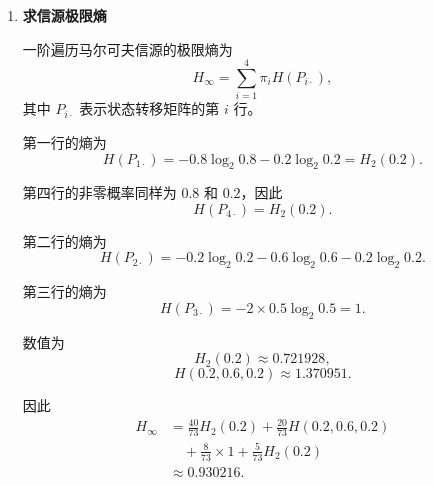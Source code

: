 \documentclass[UTF8,a4paper,12pt]{ctexart}
\begin{document}
\begin{enumerate}[label=\arabic*., leftmargin=2.2em]
稳态分布满足
\[
\boldsymbol{\pi}P=\boldsymbol{\pi},
\]
以及
\[
\pi_1+\pi_2+\pi_3+\pi_4=1.
\]

由矩阵方程可得
\[
\begin{cases}
\pi_1=0.8\pi_1+0.2\pi_2+0.8\pi_4,\\
\pi_2=0.2\pi_1+0.6\pi_2,\\
\pi_3=0.2\pi_2+0.5\pi_3,\\
\pi_4=0.5\pi_3+0.2\pi_4.
\end{cases}
\]

由第二式可得
\[
0.4\pi_2=0.2\pi_1,
\]
所以
\[
\pi_2=\frac12\pi_1.
\]

由第三式可得
\[
0.5\pi_3=0.2\pi_2,
\]
所以
\[
\pi_3=\frac25\pi_2=\frac15\pi_1.
\]

由第四式可得
\[
0.8\pi_4=0.5\pi_3,
\]
所以
\[
\pi_4=\frac58\pi_3=\frac18\pi_1.
\]

利用归一化条件，
\[
\pi_1+\frac12\pi_1+\frac15\pi_1+\frac18\pi_1=1.
\]

即
\[
\frac{73}{40}\pi_1=1,
\]
所以
\[
\pi_1=\frac{40}{73}.
\]

从而
\[
\pi_2=\frac{20}{73},
\qquad
\pi_3=\frac{8}{73},
\qquad
\pi_4=\frac{5}{73}.
\]

因此稳态分布为
\[
\boxed{
\boldsymbol{\pi}
=
\left(
\frac{40}{73},
\frac{20}{73},
\frac{8}{73},
\frac{5}{73}
\right)
}.
\]

该马尔可夫链是有限、不可约且非周期的，因此为遍历链，稳态分布唯一。


\item \textbf{求信源极限熵}

一阶遍历马尔可夫信源的极限熵为
\[
H_{\infty}
=
\sum_{i=1}^{4}
\pi_i H(P_{i\cdot}),
\]
其中 $P_{i\cdot}$ 表示状态转移矩阵的第 $i$ 行。

第一行的熵为
\[
H(P_{1\cdot})
=
-0.8\log_2 0.8-0.2\log_2 0.2
=
H_2(0.2).
\]

第四行的非零概率同样为 $0.8$ 和 $0.2$，因此
\[
H(P_{4\cdot})=H_2(0.2).
\]

第二行的熵为
\[
H(P_{2\cdot})
=
-0.2\log_2 0.2
-0.6\log_2 0.6
-0.2\log_2 0.2.
\]

第三行的熵为
\[
H(P_{3\cdot})
=
-2\times0.5\log_2 0.5
=
1.
\]

数值为
\[
H_2(0.2)\approx0.721928,
\]
\[
H(0.2,0.6,0.2)\approx1.370951.
\]

因此
\[
\begin{aligned}
H_{\infty}
&=
\frac{40}{73}H_2(0.2)
+
\frac{20}{73}H(0.2,0.6,0.2)\\
&\quad+
\frac{8}{73}\times1
+
\frac{5}{73}H_2(0.2)\\
&\approx0.930216.
\end{aligned}
\]


\end{enumerate}
\end{document}

